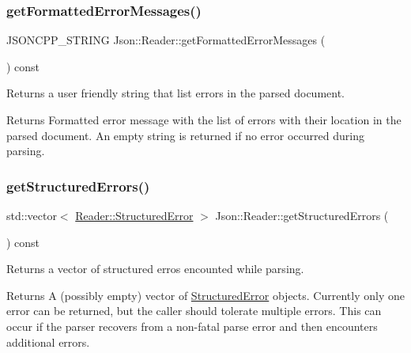 \subsubsection{\texorpdfstring{get\+Formatted\+Error\+Messages()}{getFormattedErrorMessages()}}
{\footnotesize\ttfamily J\+S\+O\+N\+C\+P\+P\+\_\+\+S\+T\+R\+I\+NG Json\+::\+Reader\+::get\+Formatted\+Error\+Messages (\begin{DoxyParamCaption}{ }\end{DoxyParamCaption}) const}



Returns a user friendly string that list errors in the parsed document. 

\begin{DoxyReturn}{Returns}
Formatted error message with the list of errors with their location in the parsed document. An empty string is returned if no error occurred during parsing. 
\end{DoxyReturn}
\mbox{\label{classJson_1_1Reader_ae3d714e95bd98b27e296c607e408189b}} 
\subsubsection{\texorpdfstring{get\+Structured\+Errors()}{getStructuredErrors()}}
{\footnotesize\ttfamily std\+::vector$<$ \hyperlink{structJson_1_1Reader_1_1StructuredError}{Reader\+::\+Structured\+Error} $>$ Json\+::\+Reader\+::get\+Structured\+Errors (\begin{DoxyParamCaption}{ }\end{DoxyParamCaption}) const}



Returns a vector of structured erros encounted while parsing. 

\begin{DoxyReturn}{Returns}
A (possibly empty) vector of \hyperlink{structJson_1_1Reader_1_1StructuredError}{Structured\+Error} objects. Currently only one error can be returned, but the caller should tolerate multiple errors. This can occur if the parser recovers from a non-\/fatal parse error and then encounters additional errors. 
\end{DoxyReturn}
\mbox{\label{classJson_1_1Reader_a86cbb42b3e6d4a4d6416473b1a8f6ae7}} 
